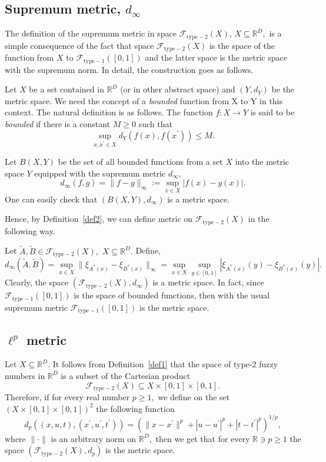 \documentclass[leqno,12pt]{amsart}
\newcommand{\R}{\mathbb{R}}
\theoremstyle{remark}
\theoremstyle{remark}
\theoremstyle{remark}
\theoremstyle{definition}
\numberwithin{equation}{section}
\begin{document}
\subsection{Supremum metric, $d_\infty$}
The definition of the supremum metric in space $\mathcal F_{\mathrm{type-2}}(X)$, $X\subseteq\R^D,$ is a simple consequence of the fact that space $\mathcal F_{\mathrm{type-2}}(X)$ is the space of the function from $X$ to $\mathcal F_{\mathrm{type-1}}([0,1])$ and the latter space is the metric space with the supremum norm. In detail, the construction goes as follows.
\par
Let $X$ be a set contained in $\R^D$ (or in other abstract space) and $(Y,d_Y)$ be the metric space. We need the concept of a {\em bounded} function from X to Y in this context. The natural definition is as follows. The function $f:X\to Y$ is said to be {\em bounded} if there is a constant $M\geq 0$ such that
$$\sup_{x,x^\prime\in X}d_Y(f(x),f(x^\prime))\leq M.$$
\par
Let $B(X,Y)$ be the set of all bounded functions from a set $X$ into the metric space $Y$ equipped with the supremum metric $d_\infty$,
$$d_\infty(f,g)=\|f-g\|_\infty:=\sup_{x\in X}|f(x)-g(x)|.$$
One can easily check that $(B(X,Y),d_\infty)$ is a metric space.
\par
Hence, by Definition~\ref{def2}, we can define metric on $\mathcal F_{\mathrm{type-2}}(X)$ in the following way.
\par
Let $\tilde A,\tilde B\in\mathcal F_{\mathrm{type-2}}(X),$ $X\subseteq\R^D.$ Define,
$$d_{\infty}(\tilde A,\tilde B)=\sup_{x\in X}\|\xi_{A^*(x)}-\xi_{B^*(x)}\|_\infty=\sup_{x\in X}\sup_{y\in[0,1]}|\xi_{A^*(x)}(y)-\xi_{B^*(x)}(y)|.$$
Clearly, the space $(\mathcal F_{\mathrm{type-2}}(X),d_\infty)$ is a metric space. In fact, since  $\mathcal F_{\mathrm{type-1}}([0,1])$ is the space of bounded functions, then with the usual supremum metric $\mathcal F_{\mathrm{type-1}}([0,1])$ is the metric space.
\subsection{$\ell^p$ metric}
Let $X\subseteq\R^D$.
It follows from Definition~\ref{def1} that the space of type-2 fuzzy numbers in $\R^D$ is a subset of the Cartesian product
$$\mathcal F_{\mathrm{type-2}}(X)\subseteq X\times[0,1]\times[0,1].$$
Therefore, if for every real number $p\geq 1,$ we define on the set $(X\times[0,1]\times[0,1])^2$ the following function
$$d_p((x,u,t),(x^\prime,u^\prime,t^\prime))=
\left(\|x-x^\prime\|^p
+|u-u^\prime|^p+|t-t^\prime|^p\right)^{1\slash p},$$
where $\|\cdot\|$ is an arbitrary norm on $\R^D,$
then we get that
for every $\R\ni p\geq 1$ the space $ (\mathcal F_{\mathrm{type-2}}(X),d_p)$ is the metric space.
\end{document}
